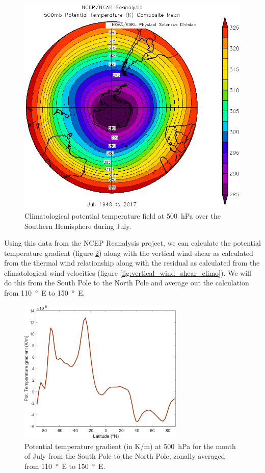 \documentclass[11pt]{article}
\begin{document}
\begin{figure}[h!]
	\centering
	\includegraphics[width=\textwidth]{500hPa_potential_temperature_July_SH_2.png}
	\caption{Climatological potential temperature field at \SI{500}{\hecto\Pa} over the Southern Hemisphere during July.}
	\label{fig:500hPa_potential_temperature_July_SH}
\end{figure}

Using this data from the NCEP Reanalysis project, we can calculate the potential temperature gradient (figure \ref{fig:thta_gradient_climo}) along with the vertical wind shear as calculated from the thermal wind relationship along with the residual as calculated from the climatological wind velocities (figure \ref{fig:vertical_wind_shear_climo}). We will do this from the South Pole to the North Pole and average out the calculation from \SI{110}{\degree E} to \SI{150}{\degree E}.

\begin{figure}[h!]
	\centering
	\includegraphics[width=0.7\textwidth]{thta_gradient.png}
	\caption{Potential temperature gradient (in K/m) at \SI{500}{\hecto\Pa} for the month of July from the South Pole to the North Pole, zonally averaged from \SI{110}{\degree E} to \SI{150}{\degree E}.}
	\label{fig:thta_gradient_climo}
\end{figure}
\end{document}
